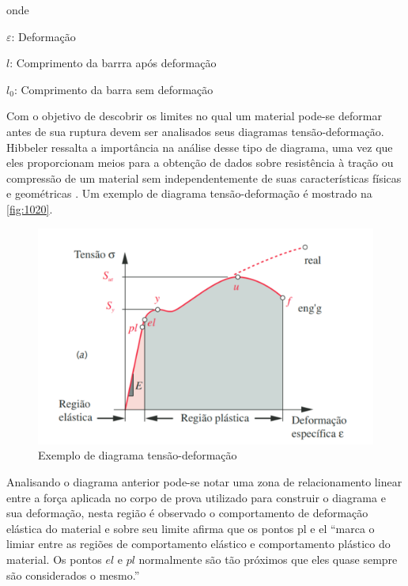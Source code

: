 onde

$\varepsilon$: Deformação

$l$: Comprimento da barrra após deformação

$l_0$: Comprimento da barra sem deformação

\hfill

Com o objetivo de descobrir os limites no qual um material pode-se deformar antes de sua ruptura devem ser analisados seus diagramas tensão-deformação.
Hibbeler ressalta a importância na análise desse tipo de diagrama, uma vez que eles proporcionam meios para a obtenção de dados sobre resistência à tração
ou compressão de um material sem independentemente de suas características físicas e geométricas \autocite{Hibbeler2010}. Um exemplo de diagrama tensão-deformação
é mostrado na \autoref{fig:1020}.

\begin{figure}[htb]
	\caption{\label{fig:1020} Exemplo de diagrama tensão-deformação}
	\begin{center}
		\includegraphics[width=\textwidth]{pictures/1020.png}
	\end{center}
\end{figure}

Analisando o diagrama anterior pode-se notar uma zona de relacionamento linear entre a força aplicada no corpo de prova utilizado para construir o diagrama e sua
deformação, nesta região é observado o comportamento de deformação elástica do material e sobre seu limite \autocite{Norton2011} afirma que os pontos pl e el
“marca o limiar entre as regiões de comportamento elástico e comportamento plástico do material.
Os pontos $el$ e $pl$ normalmente são tão próximos que eles quase sempre são considerados o mesmo.”

